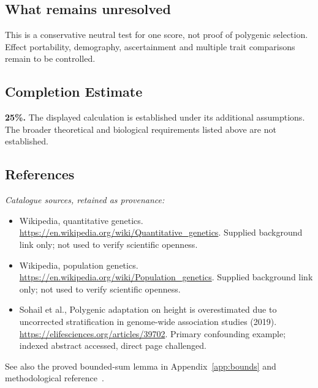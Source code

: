 \documentclass[11pt]{article}
\begin{document}
\subsection{What remains unresolved}
This is a conservative neutral test for one score, not proof of polygenic selection. Effect portability, demography, ascertainment and multiple trait comparisons remain to be controlled.
\subsection{Completion Estimate}
\textbf{25\%.} The displayed calculation is established under its additional assumptions. The broader theoretical and biological requirements listed above are not established.
\subsection{References}
\noindent\emph{Catalogue sources, retained as provenance:}
\begin{itemize}
\item Wikipedia, quantitative genetics. \url{https://en.wikipedia.org/wiki/Quantitative_genetics}. Supplied background link only; not used to verify scientific openness.
\item Wikipedia, population genetics. \url{https://en.wikipedia.org/wiki/Population_genetics}. Supplied background link only; not used to verify scientific openness.
\item Sohail et al., Polygenic adaptation on height is overestimated due to uncorrected stratification in genome-wide association studies (2019). \url{https://elifesciences.org/articles/39702}. Primary confounding example; indexed abstract accessed, direct page challenged.
\end{itemize}
\noindent See also the proved bounded-sum lemma in Appendix~\ref{app:bounds} and methodological reference~\cite{hoeffding}.
\end{document}
